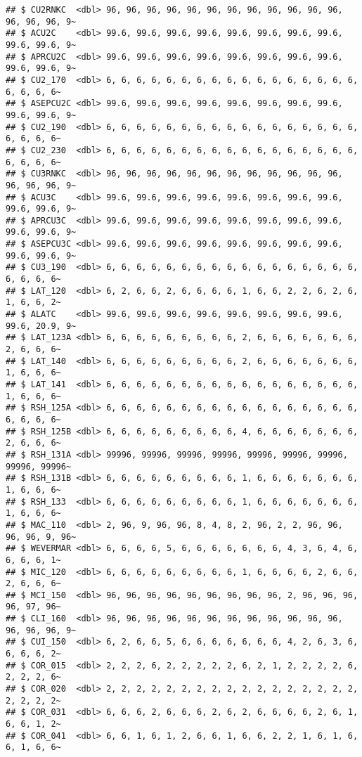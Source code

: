 \documentclass[
]{article}
\begin{document}
\begin{verbatim}
## $ CU2RNKC  <dbl> 96, 96, 96, 96, 96, 96, 96, 96, 96, 96, 96, 96, 96, 96, 96, 9~
## $ ACU2C    <dbl> 99.6, 99.6, 99.6, 99.6, 99.6, 99.6, 99.6, 99.6, 99.6, 99.6, 9~
## $ APRCU2C  <dbl> 99.6, 99.6, 99.6, 99.6, 99.6, 99.6, 99.6, 99.6, 99.6, 99.6, 9~
## $ CU2_170  <dbl> 6, 6, 6, 6, 6, 6, 6, 6, 6, 6, 6, 6, 6, 6, 6, 6, 6, 6, 6, 6, 6~
## $ ASEPCU2C <dbl> 99.6, 99.6, 99.6, 99.6, 99.6, 99.6, 99.6, 99.6, 99.6, 99.6, 9~
## $ CU2_190  <dbl> 6, 6, 6, 6, 6, 6, 6, 6, 6, 6, 6, 6, 6, 6, 6, 6, 6, 6, 6, 6, 6~
## $ CU2_230  <dbl> 6, 6, 6, 6, 6, 6, 6, 6, 6, 6, 6, 6, 6, 6, 6, 6, 6, 6, 6, 6, 6~
## $ CU3RNKC  <dbl> 96, 96, 96, 96, 96, 96, 96, 96, 96, 96, 96, 96, 96, 96, 96, 9~
## $ ACU3C    <dbl> 99.6, 99.6, 99.6, 99.6, 99.6, 99.6, 99.6, 99.6, 99.6, 99.6, 9~
## $ APRCU3C  <dbl> 99.6, 99.6, 99.6, 99.6, 99.6, 99.6, 99.6, 99.6, 99.6, 99.6, 9~
## $ ASEPCU3C <dbl> 99.6, 99.6, 99.6, 99.6, 99.6, 99.6, 99.6, 99.6, 99.6, 99.6, 9~
## $ CU3_190  <dbl> 6, 6, 6, 6, 6, 6, 6, 6, 6, 6, 6, 6, 6, 6, 6, 6, 6, 6, 6, 6, 6~
## $ LAT_120  <dbl> 6, 2, 6, 6, 2, 6, 6, 6, 6, 1, 6, 6, 2, 2, 6, 2, 6, 1, 6, 6, 2~
## $ ALATC    <dbl> 99.6, 99.6, 99.6, 99.6, 99.6, 99.6, 99.6, 99.6, 99.6, 20.9, 9~
## $ LAT_123A <dbl> 6, 6, 6, 6, 6, 6, 6, 6, 6, 2, 6, 6, 6, 6, 6, 6, 6, 2, 6, 6, 6~
## $ LAT_140  <dbl> 6, 6, 6, 6, 6, 6, 6, 6, 6, 2, 6, 6, 6, 6, 6, 6, 6, 1, 6, 6, 6~
## $ LAT_141  <dbl> 6, 6, 6, 6, 6, 6, 6, 6, 6, 6, 6, 6, 6, 6, 6, 6, 6, 1, 6, 6, 6~
## $ RSH_125A <dbl> 6, 6, 6, 6, 6, 6, 6, 6, 6, 6, 6, 6, 6, 6, 6, 6, 6, 6, 6, 6, 6~
## $ RSH_125B <dbl> 6, 6, 6, 6, 6, 6, 6, 6, 6, 4, 6, 6, 6, 6, 6, 6, 6, 2, 6, 6, 6~
## $ RSH_131A <dbl> 99996, 99996, 99996, 99996, 99996, 99996, 99996, 99996, 99996~
## $ RSH_131B <dbl> 6, 6, 6, 6, 6, 6, 6, 6, 6, 1, 6, 6, 6, 6, 6, 6, 6, 1, 6, 6, 6~
## $ RSH_133  <dbl> 6, 6, 6, 6, 6, 6, 6, 6, 6, 1, 6, 6, 6, 6, 6, 6, 6, 1, 6, 6, 6~
## $ MAC_110  <dbl> 2, 96, 9, 96, 96, 8, 4, 8, 2, 96, 2, 2, 96, 96, 96, 96, 9, 96~
## $ WEVERMAR <dbl> 6, 6, 6, 6, 5, 6, 6, 6, 6, 6, 6, 6, 4, 3, 6, 4, 6, 6, 6, 6, 1~
## $ MIC_120  <dbl> 6, 6, 6, 6, 6, 6, 6, 6, 6, 1, 6, 6, 6, 6, 2, 6, 6, 2, 6, 6, 6~
## $ MCI_150  <dbl> 96, 96, 96, 96, 96, 96, 96, 96, 96, 2, 96, 96, 96, 96, 97, 96~
## $ CLI_160  <dbl> 96, 96, 96, 96, 96, 96, 96, 96, 96, 96, 96, 96, 96, 96, 96, 9~
## $ CUI_150  <dbl> 6, 2, 6, 6, 5, 6, 6, 6, 6, 6, 6, 6, 4, 2, 6, 3, 6, 6, 6, 6, 2~
## $ COR_015  <dbl> 2, 2, 2, 6, 2, 2, 2, 2, 2, 6, 2, 1, 2, 2, 2, 2, 6, 2, 2, 2, 6~
## $ COR_020  <dbl> 2, 2, 2, 2, 2, 2, 2, 2, 2, 2, 2, 2, 2, 2, 2, 2, 2, 2, 2, 2, 2~
## $ COR_031  <dbl> 6, 6, 6, 2, 6, 6, 6, 2, 6, 2, 6, 6, 6, 6, 2, 6, 1, 6, 6, 1, 2~
## $ COR_041  <dbl> 6, 6, 1, 6, 1, 2, 6, 6, 1, 6, 6, 2, 2, 1, 6, 1, 6, 6, 1, 6, 6~

\end{verbatim}
\end{document}
